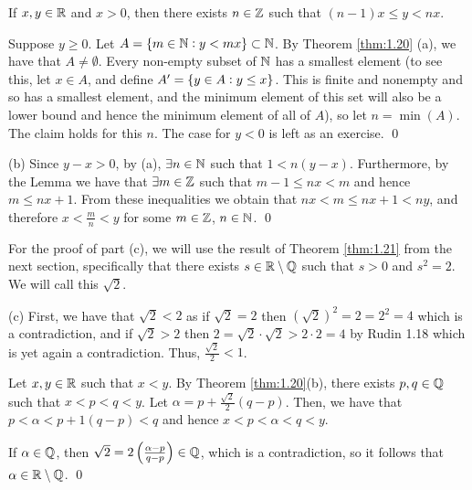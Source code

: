 \begin{nlemma}{}
    If $x, y \in \mathbb{R}$ and $x > 0$, then there exists $n \in \mathbb{Z}$ such that $(n-1)x \leq y < nx$. 
\end{nlemma}
\begin{nproof}
    Suppose $y \geq 0$. Let $A = \set{m \in \mathbb{N}: y < mx} \subset \mathbb{N}$. By Theorem \ref{thm:1.20} (a), we have that $A \neq \emptyset$. Every non-empty subset of $\mathbb{N}$ has a smallest element (to see this, let $x \in A$, and define $A' = \set{y \in A: y \leq x}$. This is finite and nonempty and so has a smallest element, and the minimum element of this set will also be a lower bound and hence the minimum element of all of $A$), so let $n = \min(A)$. The claim holds for this $n$.
    The case for $y < 0$ is left as an exercise. \qed
\end{nproof}
\begin{nproof}
    (b) Since $y - x > 0$, by (a), $\exists n \in \mathbb{N}$ such that $1 < n(y-x)$. Furthermore, by the Lemma we have that $\exists m \in \mathbb{Z}$ such that $m - 1 \leq nx < m$ and hence $m \leq nx + 1$. From these inequalities we obtain that $nx < m \leq nx + 1 < ny$, and therefore $x < \frac{m}{n} < y$ for some $m \in \mathbb{Z}$, $n \in \mathbb{N}$. \qed
\end{nproof}
\noindent For the proof of part (c), we will use the result of Theorem \ref{thm:1.21} from the next section, specifically that there exists $s \in \mathbb{R} \setminus \mathbb{Q}$ such that $s > 0$ and $s^2 = 2$. We will call this $\sqrt{2}$.
\begin{nproof}
    (c) First, we have that $\sqrt{2} < 2$ as if $\sqrt{2} = 2$ then $(\sqrt{2})^2 = 2 = 2^2 = 4$ which is a contradiction, and if $\sqrt{2} > 2$ then $2 = \sqrt{2}\cdot \sqrt{2} > 2\cdot 2 = 4$ by Rudin 1.18 which is yet again a contradiction. Thus, $\frac{\sqrt{2}}{2} < 1$. 
    
    Let $x, y \in \mathbb{R}$ such that $x < y$. By Theorem \ref{thm:1.20}(b), there exists $p, q \in \mathbb{Q}$ such that $x < p < q < y$. Let $\alpha = p + \frac{\sqrt{2}}{2}(q - p)$. Then, we have that $p  <\alpha < p + 1(q-p) < q$ and hence $x < p < \alpha < q < y$.

    If $\alpha \in \mathbb{Q}$, then $\sqrt{2} = 2\left(\frac{\alpha-p}{q-p}\right) \in \mathbb{Q}$, which is a contradiction, so it follows that $\alpha \in \mathbb{R} \setminus \mathbb{Q}$. \qed
\end{nproof}

